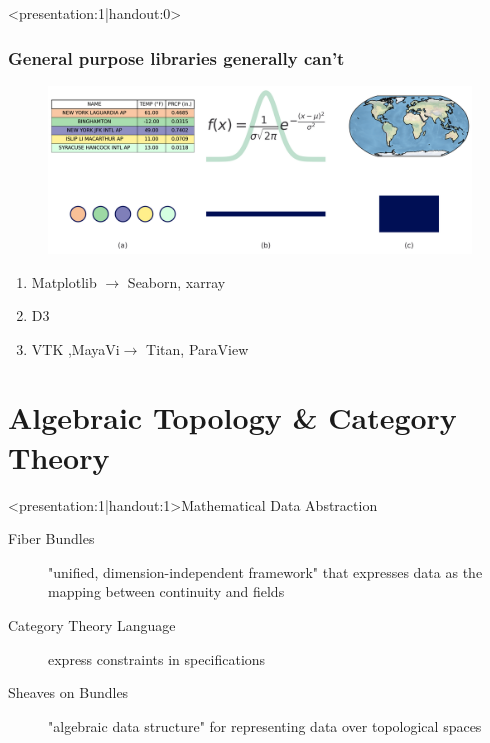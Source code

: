 \documentclass[xcolor={dvipsnames}]{beamer}
\begin{document}
\begin{frame}<presentation:1|handout:0>
    \frametitle{General purpose libraries generally can't\cite{toryRethinkingVisualizationHighlevel2004}}
    \begin{figure}
        \includegraphics[height=.3\textheight]{../paper/figures/k_different_types.png}
    \end{figure}

    \begin{enumerate}
        \item Matplotlib\cite{hunterMatplotlib2DGraphics2007} $\rightarrow$ Seaborn\cite{waskom2020seaborn}, xarray \cite{hoyer2017xarray} 
        \item D3 \cite{bostockDataDrivenDocuments2011}
        \item VTK \cite{hanwellVisualizationToolkitVTK2015,geveciVTK2012},MayaVi\cite{RamachandranMayaVI2011}$\rightarrow$ Titan\cite{brianwylieUnifiedToolkitInformation2009}, ParaView\cite{ahrens2005paraview}
    \end{enumerate}
\end{frame}

\section{Algebraic Topology & Category Theory}
\begin{frame}<presentation:1|handout:1>{Mathematical Data Abstraction}
    \begin{description}
        \item[Fiber Bundles] "unified, dimension-independent framework" that expresses data as the mapping between continuity and fields \cite{butlerVectorBundleClassesForm1992,butlerVisualizationModelBased1989}
        \item[Category Theory Language] express constraints in specifications \cite{wielsManagementEvolvingSpecifications1998}   
        \item[Sheaves on Bundles] "algebraic data structure" for representing data over topological spaces \cite{ghristElementaryAppliedTopology2014}
    \end{description}
\end{frame}
\end{document}

